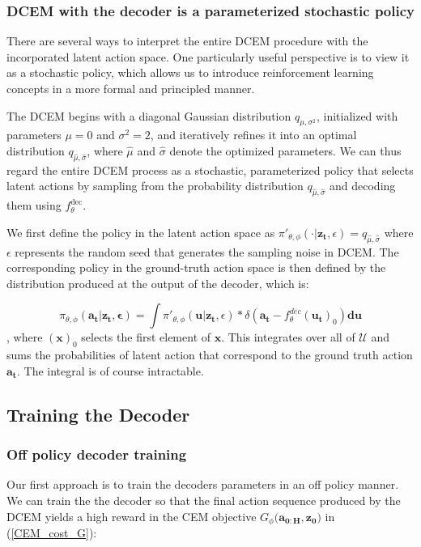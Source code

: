 \documentclass{article}
\newcommand{\mbf}[1]{\mathbf{#1}}
\begin{document}
\subsubsection{DCEM with the decoder is a parameterized stochastic policy}
There are several ways to interpret the entire DCEM procedure with the incorporated latent action space. One particularly useful perspective is to view it as a stochastic policy, which allows us to introduce reinforcement learning concepts in a more formal and principled manner.

The DCEM begins with a diagonal Gaussian distribution $q_{\mu,\sigma^2}$, initialized with parameters $\mu = 0$ and $\sigma^2 = 2$, and iteratively refines it into an optimal distribution $q_{\hat{\mu},\hat{\sigma}}$, where $\hat{\mu}$ and $\hat{\sigma}$ denote the optimized parameters. We can thus regard the entire DCEM process as a stochastic, parameterized policy that selects latent actions by sampling from the probability distribution $q_{\hat{\mu},\hat{\sigma}}$ and decoding them using $f^{\text{dec}}_\theta$.

We first define the policy in the latent action space as $\pi'_{\theta,\phi}(\cdot|\mathbf{z_t},\epsilon)=q_{{\hat\mu,\hat\sigma}}$ where $\epsilon$ represents the random seed that generates the sampling noise in DCEM. The corresponding policy in the ground-truth action space is then defined by the distribution produced at the output of the decoder, which is:

\begin{equation}
\pi_{\theta,\phi}(\mbf{a_t|z_t,\epsilon})= \int \pi'_{\theta,\phi}(\mbf{u}|\mbf{z_t},\epsilon)*\delta(\mbf{a_t}-f^{dec}_\theta(\mbf{u_t})_0)\mbf{du}
\end{equation}
, where $(\mbf{x})_0$ selects the first element of $\mbf{x}$.
This integrates over all of $\mathcal{U}$ and sums the probabilities of latent action that correspond to the ground truth action $\mbf{a_t}$. The integral is of course intractable.



\subsection{Training the Decoder}

\subsubsection{Off policy decoder training}
Our first approach is to train the decoders parameters in an off policy manner. We can train the the decoder so that the final action sequence produced by the DCEM yields a high reward in the CEM objective $G_\phi(\mbf{a_{0:H},z_0)}$ in (\ref{CEM_cost_G}):
\end{document}
